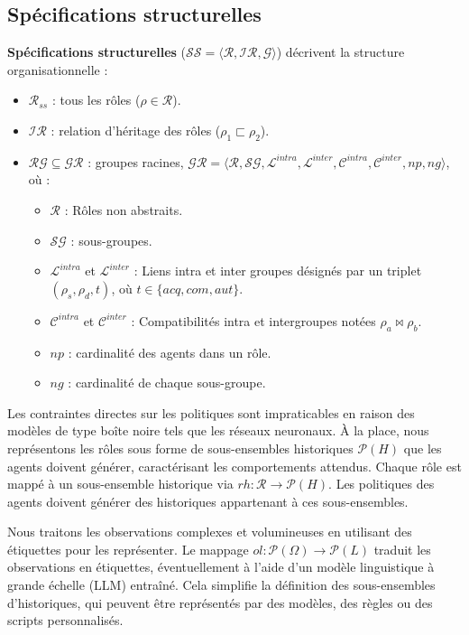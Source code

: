 \subsection{Spécifications structurelles}

\textbf{Spécifications structurelles} ($\mathcal{SS} = \langle \mathcal{R}, \mathcal{IR}, \mathcal{G} \rangle$) décrivent la structure organisationnelle :
\begin{itemize}
  \item $\mathcal{R}_{ss}$ : tous les rôles ($\rho \in \mathcal{R}$).
  \item $\mathcal{IR}$ : relation d'héritage des rôles ($\rho_1 \sqsubset \rho_2$).
  \item $\mathcal{RG} \subseteq \mathcal{GR}$ : groupes racines, $\mathcal{GR} = \langle \mathcal{R}, \mathcal{SG}, \mathcal{L}^{intra}, \mathcal{L}^{inter}, \mathcal{C}^{intra}, \mathcal{C}^{inter}, np, ng \rangle$, où :
        \begin{itemize}
          \item $\mathcal{R}$ : Rôles non abstraits.
          \item $\mathcal{SG}$ : sous-groupes.
          \item $\mathcal{L}^{intra}$ et $\mathcal{L}^{inter}$ : Liens intra et inter groupes désignés par un triplet $(\rho_s, \rho_d, t)$, où $t \in \{acq, com, aut\}$.
          \item $\mathcal{C}^{intra}$ et $\mathcal{C}^{inter}$ : Compatibilités intra et intergroupes notées $\rho_a \bowtie \rho_b$.
          \item $np$ : cardinalité des agents dans un rôle.
          \item $ng$ : cardinalité de chaque sous-groupe.
        \end{itemize}
\end{itemize}

Les contraintes directes sur les politiques sont impraticables en raison des modèles de type boîte noire tels que les réseaux neuronaux. À la place, nous représentons les rôles sous forme de sous-ensembles historiques $\mathcal{P}(H)$ que les agents doivent générer, caractérisant les comportements attendus. Chaque rôle est mappé à un sous-ensemble historique via $rh: \mathcal{R} \rightarrow \mathcal{P}(H)$. Les politiques des agents doivent générer des historiques appartenant à ces sous-ensembles.

Nous traitons les observations complexes et volumineuses en utilisant des étiquettes pour les représenter. Le mappage $ol: \mathcal{P}(\Omega) \rightarrow \mathcal{P}(L)$ traduit les observations en étiquettes, éventuellement à l'aide d'un modèle linguistique à grande échelle (LLM) entraîné. Cela simplifie la définition des sous-ensembles d'historiques, qui peuvent être représentés par des modèles, des règles ou des scripts personnalisés.

